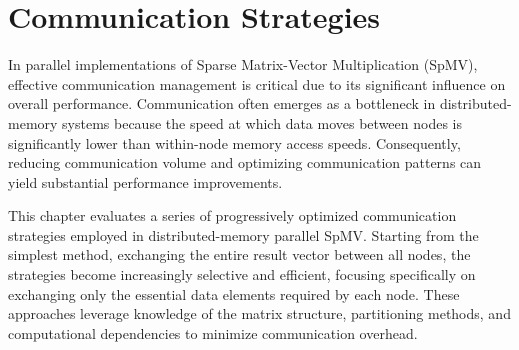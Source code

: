 \chapter{Communication Strategies}



In parallel implementations of Sparse Matrix-Vector Multiplication (SpMV), effective communication management is critical due to its significant influence on overall performance. Communication often emerges as a bottleneck in distributed-memory systems because the speed at which data moves between nodes is significantly lower than within-node memory access speeds. Consequently, reducing communication volume and optimizing communication patterns can yield substantial performance improvements.
\medskip

This chapter evaluates a series of progressively optimized communication strategies employed in distributed-memory parallel SpMV. Starting from the simplest method, exchanging the entire result vector between all nodes, the strategies become increasingly selective and efficient, focusing specifically on exchanging only the essential data elements required by each node. These approaches leverage knowledge of the matrix structure, partitioning methods, and computational dependencies to minimize communication overhead.
\medskip



